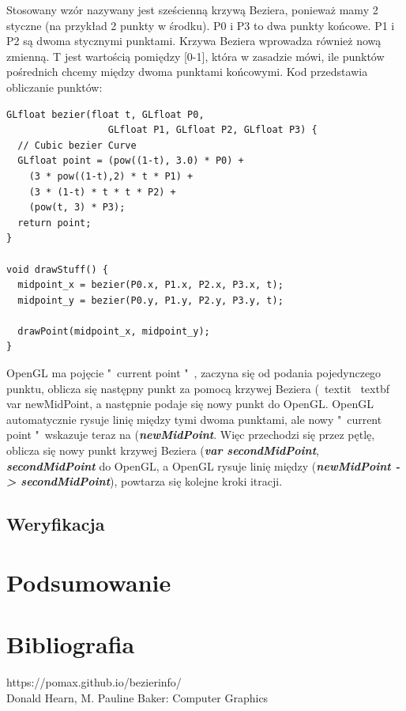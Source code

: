 \documentclass[paper=a4, fontsize=11pt]{scrartcl} %
\begin{document}
Stosowany wzór nazywany jest sześcienną krzywą Beziera, ponieważ mamy 2 styczne (na przykład 2 punkty w środku). P0 i P3 to dwa punkty końcowe. P1 i P2 są dwoma stycznymi punktami. Krzywa Beziera wprowadza również nową zmienną. T jest wartością pomiędzy [0-1], która w zasadzie mówi, ile punktów pośrednich chcemy między dwoma punktami końcowymi.
Kod przedstawia obliczanie punktów: \\
\lstset{language=C++}
\begin{lstlisting}[frame=single]
GLfloat bezier(float t, GLfloat P0,
                  GLfloat P1, GLfloat P2, GLfloat P3) {
  // Cubic bezier Curve
  GLfloat point = (pow((1-t), 3.0) * P0) +
    (3 * pow((1-t),2) * t * P1) +
    (3 * (1-t) * t * t * P2) +
    (pow(t, 3) * P3);
  return point;
}

void drawStuff() {
  midpoint_x = bezier(P0.x, P1.x, P2.x, P3.x, t);
  midpoint_y = bezier(P0.y, P1.y, P2.y, P3.y, t);

  drawPoint(midpoint_x, midpoint_y);
}
\end{lstlisting}

OpenGL ma pojęcie "\ current point "\ , zaczyna się od podania pojedynczego punktu, oblicza się następny punkt za pomocą krzywej Beziera (\ textit {\ textbf {var newMidPoint}}, a następnie podaje się nowy punkt do OpenGL. OpenGL automatycznie rysuje linię między tymi dwoma punktami, ale nowy "\ current point "\ wskazuje teraz na (\textit {\textbf {newMidPoint}}. Więc przechodzi się przez pętlę, oblicza się nowy punkt krzywej Beziera (\textit {\textbf {var secondMidPoint}}, \textit {\textbf {secondMidPoint}} do OpenGL, a OpenGL rysuje linię między (\textit {\textbf {newMidPoint -> secondMidPoint}}), powtarza się kolejne kroki itracji.


\newpage
\subsection{Weryfikacja}
\section{Podsumowanie}
\section{Bibliografia}
https://pomax.github.io/bezierinfo/ \\
Donald Hearn, M. Pauline Baker: Computer Graphics
\end{document}
